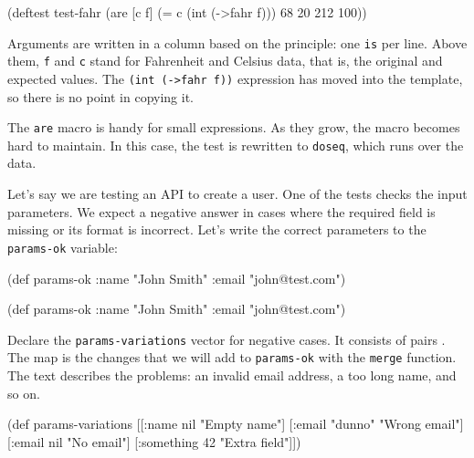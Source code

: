 \begin{english}
  \begin{clojure}
(deftest test-fahr
  (are [c f] (= c (int (->fahr f)))
    68 20
    212 100))
  \end{clojure}
\end{english}

Arguments are written in a column based on the principle: one \verb|is| per line. Above them, \verb|f| and \verb|c| stand for Fahrenheit and Celsius data, that is, the original and expected values. The \verb|(int (->fahr f))| expression has moved into the template, so there is no point in copying it.

The \verb|are| macro is handy for small expressions. As they grow, the macro becomes hard to maintain. In this case, the test is rewritten to \verb|doseq|, which runs over the data.

Let's say we are testing an API to create a user. One of the tests checks the input parameters. We expect a negative answer in cases where the required field is missing or its format is incorrect. Let's write the correct parameters to the \verb|params-ok| variable:

\ifnarrow

\begin{english}
  \begin{clojure}
(def params-ok {:name "John Smith"
                :email "john@test.com"})
  \end{clojure}
\end{english}

\else

\begin{english}
  \begin{clojure}
(def params-ok {:name "John Smith" :email "john@test.com"})
  \end{clojure}
\end{english}

\fi

Declare the \verb|params-variations| vector for negative cases. It consists of pairs . The map is the changes that we will add to  \verb|params-ok| with the \verb|merge| function. The text describes the problems: an invalid email address, a too long name, and so on.

\begin{english}
  \begin{clojure}
(def params-variations
  [[{:name nil}      "Empty name"]
   [{:email "dunno"} "Wrong email"]
   [{:email nil}     "No email"]
   [{:something 42}  "Extra field"]])
  \end{clojure}
\end{english}

